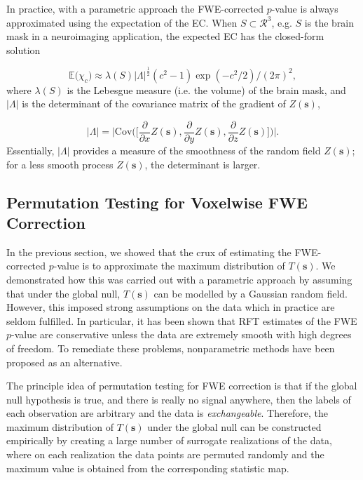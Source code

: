 In practice, with a parametric approach the FWE-corrected $p$-value is always approximated using the expectation of the EC. When $S \subset \mathcal{R}^{3}$,  e.g. $S$ is the brain mask in a neuroimaging application, the expected EC has the closed-form solution 

\begin{equation}
\label{eq:EC_closed_form_approx}
\mathbb{E}\Big(\chi_{c} \Big) \approx \lambda(S)|\Lambda|^{\frac{1}{2}}(c^{2} - 1)\exp{(- c^{2}/2)}/(2\pi)^{2},
\end{equation}
where $\lambda(S)$ is the Lebesgue measure (i.e. the volume) of the brain mask, and $|\Lambda|$ is the determinant of the covariance matrix of the gradient of $Z(\bm{s})$,

\begin{equation}
\label{Lamda_determinant}
|\Lambda| = \Bigg|\mathrm{Cov}\bigg(\bigg[\frac{\partial}{\partial x}Z(\bm{s}), \frac{\partial}{\partial y}Z(\bm{s}), \frac{\partial}{\partial z}Z(\bm{s})\bigg]\bigg)\Bigg|.
\end{equation}
Essentially, $|\Lambda|$ provides a measure of the smoothness of the random field $Z(\bm{s})$; for a less smooth process $Z(\bm{s})$, the determinant is  larger. 


\subsection{Permutation Testing for Voxelwise FWE Correction}

In the previous section, we showed that the crux of estimating the FWE-corrected $p$-value is to approximate the maximum distribution of $T(\bm{s})$. We demonstrated how this was carried out with a parametric approach by assuming that under the global null, $T(\bm{s})$ can be modelled by a Gaussian random field. However, this imposed strong assumptions on the data which in practice are seldom fulfilled. In particular, it has been shown that RFT estimates of the FWE $p$-value are conservative unless the data are extremely smooth with high degrees of freedom. To remediate these problems, nonparametric methods have been proposed as an alternative.

The principle idea of permutation testing for FWE correction is that if the global null hypothesis is true, and there is really no signal anywhere, then the labels of each observation are arbitrary and the data is \textit{exchangeable}. Therefore, the maximum distribution of $T(\bm{s})$ under the global null can be constructed empirically by creating a large number of surrogate realizations of the data, where on each realization the data points are permuted randomly and the maximum value is obtained from the corresponding statistic map. 

